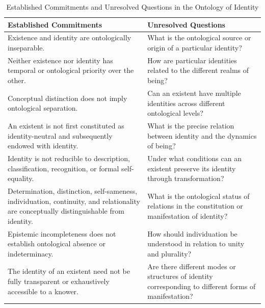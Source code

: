 
\begin{table}[htbp]
\centering
\small
\caption{Established Commitments and Unresolved Questions in the Ontology of Identity}
\label{tab:identity-established-and-unresolved}

\renewcommand{\arraystretch}{1.45}

\begin{tabular}{
    |p{}
    |p{}|
}
\hline

\textbf{Established Commitments}
&
\textbf{Unresolved Questions}
\\
\hline

Existence and identity are ontologically inseparable.
&
What is the ontological source or origin of a particular identity?
\\
\hline

Neither existence nor identity has temporal or ontological priority over the other.
&
How are particular identities related to the different realms of being?
\\
\hline

Conceptual distinction does not imply ontological separation.
&
Can an existent have multiple identities across different ontological levels?
\\
\hline

An existent is not first constituted as identity-neutral and subsequently endowed with identity.
&
What is the precise relation between identity and the dynamics of being?
\\
\hline

Identity is not reducible to description, classification, recognition, or formal self-equality.
&
Under what conditions can an existent preserve its identity through transformation?
\\
\hline

Determination, distinction, self-sameness, individuation, continuity, and relationality are conceptually distinguishable from identity.
&
What is the ontological status of relations in the constitution or manifestation of identity?
\\
\hline

Epistemic incompleteness does not establish ontological absence or indeterminacy.
&
How should individuation be understood in relation to unity and plurality?
\\
\hline

The identity of an existent need not be fully transparent or exhaustively accessible to a knower.
&
Are there different modes or structures of identity corresponding to different forms of manifestation?
\\
\hline

\end{tabular}

\end{table}
